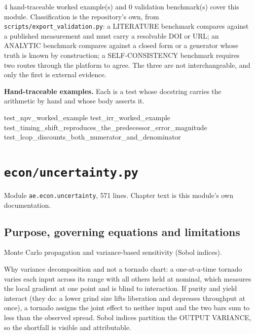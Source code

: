 \documentclass[10pt,a4paper,twoside]{report}
\begin{document}
4 hand-traceable worked example(s) and 0 validation benchmark(s) cover this module. Classification is the repository's own, from \texttt{scripts/export\_validation.py}: a LITERATURE benchmark compares against a published measurement and must carry a resolvable DOI or URL; an ANALYTIC benchmark compares against a closed form or a generator whose truth is known by construction; a SELF-CONSISTENCY benchmark requires two routes through the platform to agree. The three are not interchangeable, and only the first is external evidence.

\textbf{Hand-traceable examples.} Each is a test whose docstring carries the arithmetic by hand and whose body asserts it.

\begin{verbatimsmall}
test_npv_worked_example
test_irr_worked_example
test_timing_shift_reproduces_the_predecessor_error_magnitude
test_lcop_discounts_both_numerator_and_denominator
\end{verbatimsmall}

\clearpage

\chapter{\texttt{econ/uncertainty.py}}\label{ch:uncertainty}


{\footnotesize\color{slate}Module \texttt{ae.econ.uncertainty}, 571 lines. Chapter text is this module's own documentation.\par}

\section{Purpose, governing equations and limitations}

Monte Carlo propagation and variance-based sensitivity (Sobol indices).

Why variance decomposition and not a tornado chart: a one-at-a-time tornado varies each input across its range with all others held at nominal, which measures the local gradient at one point and is blind to interaction. If purity and yield interact (they do: a lower grind size lifts liberation and depresses throughput at once), a tornado assigns the joint effect to neither input and the two bars sum to less than the observed spread. Sobol indices partition the OUTPUT VARIANCE, so the shortfall is visible and attributable.
\end{document}
